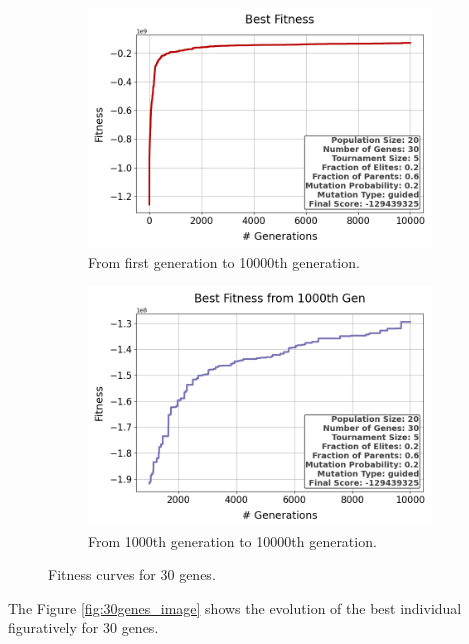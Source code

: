 \documentclass{assignment}
\begin{document}
\begin{figure}[h!]
    \begin{subfigure}{0.5\textwidth}
        \includegraphics[width=\textwidth]{figures/best_fitness_output_20_30_5_0.2_0.6_0.2_guided.png}
        \caption{From first generation to 10000th generation.}
    \end{subfigure}\hfill
    \begin{subfigure}{0.5\textwidth}
        \includegraphics[width=\textwidth]{figures/best_fitness_1000_output_20_30_5_0.2_0.6_0.2_guided.png}
        \caption{From 1000th generation to 10000th generation.}
    \end{subfigure}
    \caption{Fitness curves for 30 genes.}
\label{fig:30genes}
\end{figure}

The Figure \ref{fig:30genes_image} shows the evolution of the best individual figuratively for 30 genes.
\end{document}
